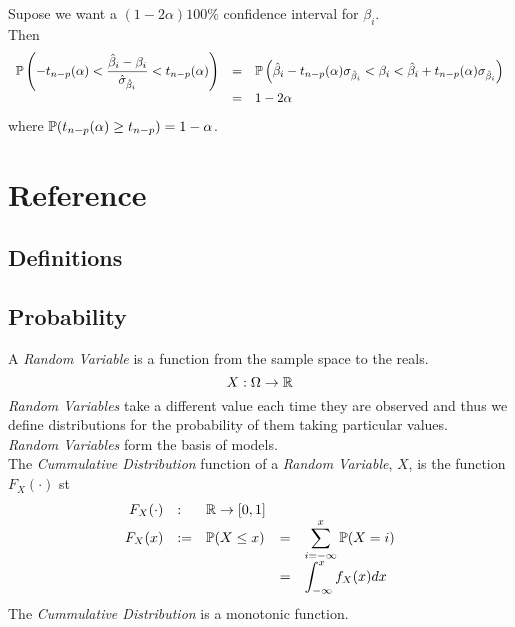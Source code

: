 \documentclass[11pt,a4paper]{article}
\begin{document}
Supose we want a $(1-2\alpha)100\%$ confidence interval for $\beta_i$.\\
Then
\[\begin{array}{rcl}
\mathbb{P}\left(-t_{n-p}(\alpha)<\dfrac{\hat\beta_i-\beta_i}{\hat\sigma_{\hat\beta_i}}<t_{n-p}(\alpha)\right)&=&\mathbb{P}\left(\hat\beta_i-t_{n-p}(\alpha)\sigma_{\hat\beta_i}<\beta_i<\hat\beta_i+t_{n-p}(\alpha)\sigma_{\hat\beta_i}\right)\\
&=&1-2\alpha
\end{array}\]
where $\mathbb{P}(t_{n-p}(\alpha)\geq t_{n-p})=1-\alpha$.\\

\newpage
\setcounter{section}{-1}
\section{Reference}

\subsection{Definitions}






\subsection{Probability}

A \textit{Random Variable} is a function from the sample space to the reals.
$$X:\Omega\to\mathbb{R}$$
\textit{Random Variables} take a different value each time they are observed and thus we define distributions for the probability of them taking particular values.\\
\textit{Random Variables} form the basis of models.\\

The \textit{Cummulative Distribution} function of a \textit{Random Variable}, $X$, is the function $F_X(\cdot)$ st
\[\begin{array}{rllrl}
F_X(\cdot)&:&\mathbb{R}\to[0,1]\\
F_X(x)&:=&\mathbb{P}(X\leq x)&=&\displaystyle\sum_{i=-\infty}^x\mathbb{P}(X=i)\\
&&&=&\displaystyle\int_{-\infty}^xf_X(x)dx
\end{array}\]
The \textit{Cummulative Distribution} is a monotonic function.\\
\end{document}

